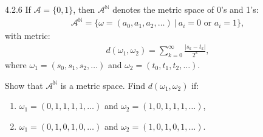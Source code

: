 \begin{problem}{4.2.6}
  If $\mathcal{A}= \{0, 1\}$, then $\mathcal{A}^\mathbb{N}$ denotes the metric
  space of 0's and 1's:
  \begin{align*}
    \mathcal{A}^\mathbb{N} = \{\omega = (a_0, a_1, a_2, \dots) \ |\ \text{$a_i = 0$ or $a_i = 1$}\},
  \end{align*}
  with metric:
  \begin{align}\label{metric}
    d(\omega_1, \omega_2) = \sum_{k=0}^\infty\frac{|s_k - t_k|}{2^k},
  \end{align}
  where $\omega_1 = (s_0, s_1, s_2, \dots)$ and $\omega_2 = (t_0, t_1, t_2, \dots)$.

  Show that $\mathcal{A}^\mathbb{N}$ is a metric space. Find $d(\omega_1, \omega_2)$ if:
  \begin{enumerate}
    \item $\omega_1 = (0, 1, 1, 1, 1, \dots)$ and $\omega_2 = (1, 0, 1, 1, 1, \dots )$,
    \item $\omega_1 = (0, 1, 0, 1, 0, \dots)$ and $\omega_2 = (1, 0, 1, 0, 1, \dots )$.
  \end{enumerate}
\end{problem}

